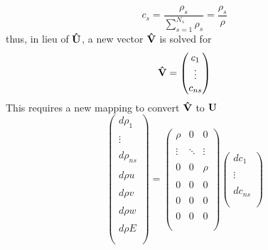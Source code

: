 \documentclass{article}   	%
\begin{document}
\begin{equation}
  c_s = \frac{\rho_s}{\sum_{s=1}^{N_s}{\rho_s}} = \frac{\rho_s}{\rho}
  \label{mass-frac-def}
\end{equation}
thus, in lieu of $\mathbf{\hat{U}}$, a new vector $\mathbf{\hat{V}}$ is solved for
\begin{equation}
  \mathbf{\hat{V}} = 
  \begin{pmatrix}
 		c_1    \\
 		\vdots \\
    c_{ns} \\
	\end{pmatrix}
  \label{mass-frac-vec}
\end{equation}
This requires a new mapping to convert $\mathbf{\hat{V}}$ to $\mathbf U$
\begin{equation}
  \begin{pmatrix}
 		d \rho_1    \\ \\
		  \vdots    \\ \\
		d \rho_{ns} \\ \\
		d \rho u    \\ \\
		d \rho v    \\ \\
		d \rho w    \\ \\
		d \rho E    \\ \\
	\end{pmatrix} =
  \begin{pmatrix}
    \rho   &    0    & 0      \\ \\
    \vdots & \ddots  & \vdots \\ \\
    0      &    0    & \rho   \\ \\
    0      &    0    & 0      \\ \\
    0      &    0    & 0      \\ \\
    0      &    0    & 0      \\ \\
  \end{pmatrix}
  \begin{pmatrix}
 		d c_1    \\ \\
 		\vdots   \\ \\
    d c_{ns} \\ \\
	\end{pmatrix}
  \label{q-map3}
\end{equation}
\end{document}
